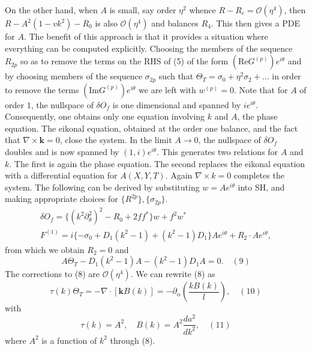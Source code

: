 \documentclass[12pt]{article}
\begin{document}
\begin{itemize}
        On the other hand, when $A$ is small, say order $\eta^2$ whence $R-R_c = \mathcal{O}(\eta^4)$, then $R-A^2(1-vk^2)-R_0$ is also $\mathcal{O}(\eta^4)$ and balances $R_4$. This then gives a PDE for $A$. \newline
        The benefit of this approach is that it provides a situation where everything can be computed explicitly. Choosing the members of the sequence $R_{2p}$ so as to remove the terms on the RHS of (5) of the form $(\text{Re}G^{(p)})e^{i\theta}$ and by choosing members of the sequence $\sigma_{2p}$ such that $\Theta_T=\sigma_0 + \eta^2\sigma_2+\dots$ in order to remove the terms $(\text{Im}G^{(p)})e^{i\theta}$ we are left with $w^{(p)}=0$. \newline
        Note that for $A$ of order $1$, the nullspace of $\delta O_f$ is one dimensional and spanned by $ie^{i\theta}$. Consequently, one obtains only one equation involving $k$ and $A$, the phase equation. The eikonal equation, obtained at the order one balance, and the fact that $\nabla \times \bm{k}=0$, close the system. In the limit $A \rightarrow 0$, the nullspace of $\delta O_f$ doubles and is now spanned by $(1,i)e^{i\theta}$. This generates two relations for $A$ and $k$. The first is again the phase equation. The second replaces the eikonal equation with a differential equation for $A(X,Y,T)$. Again $\nabla \times k=0$ completes the system. 
        The following can be derived by substituting $w=Ae^{i\theta}$ into SH, and making appropriate choices for $\{R^{2p}\}, \{\sigma_{2p}\}$. 
        \begin{gather*}
            \delta O_f = \{(k^2\partial^2_{\theta})^2-R_0+2ff^{*}\}w+f^2w^{*}\\
            F^{(1)} = i\{-\sigma_0 + D_1(k^2-1) + (k^2-1)D_1\}Ae^{i\theta}+R_2\cdot Ae^{i\theta},
        \end{gather*}
    from which we obtain $R_2=0$ and
    \[
        A \Theta_T -D_1(k^2-1)A - (k^2-1)D_1A = 0. \quad (9)
    \] 
    The corrections to (8) are $\mathcal{O}(\eta^4)$. We can rewrite (8) as 
    \[
        \tau(k)\Theta_T = -\nabla \cdot \left[\bm{k}B(k)\right] = -\partial_{\alpha}\left(\frac{kB(k)}{l}\right), \quad (10)
    \] 
    with
    \[
        \tau(k) = A^2, \quad B(k) = A^2\frac{d a^2}{dk^2}, \quad (11)
    \] 
    where $A^2$ is a function of $k^2$ through (8).

\end{itemize}
\end{document}
